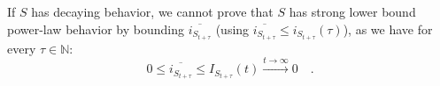 \documentclass[../../main.tex]{subfiles}
\begin{document}
    \begin{remark}
        If $S$ has decaying behavior, we cannot prove that $S$ has strong lower bound power-law behavior by bounding $\overline{i_{S_{t + \tau}}}$ (using $\overline{i_{S_{t + \tau}}} \leq i_{S_{t + \tau}}(\tau)$), as we have for every $\tau \in \mathbb{N}$:
        \[
            0 \leq \overline{i_{S_{t + \tau}}} \leq I_{S_{t + \tau}}(t) \xrightarrow{t \to \infty} 0 \quad .
        \]
    \end{remark}

\end{document}
